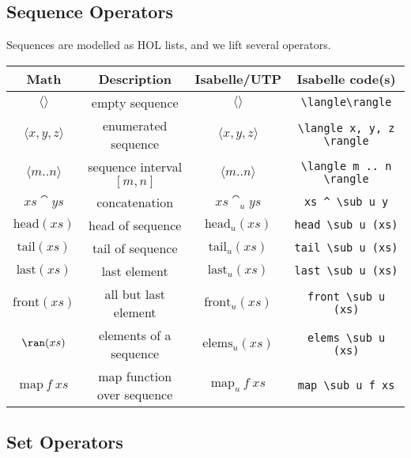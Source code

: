 \documentclass[11pt]{article}
\begin{document}
\subsection{Sequence Operators}

Sequences are modelled as HOL lists, and we lift several operators.

\vspace{2ex}

\begin{center}
\begin{tabular}{|c|c|c|c|} \hline
  \textbf{Math}                  & \textbf{Description}        & \textbf{Isabelle/UTP}          & \textbf{Isabelle code(s)} \\ \hline
  $\langle\rangle$               & empty sequence              & $\langle\rangle$               & \verb|\langle\rangle| \\
  $\langle x, y, z \rangle$      & enumerated sequence         & $\langle x, y, z \rangle$ & \verb|\langle x, y, z \rangle| \\
  $\langle m .. n \rangle$       & sequence interval $[m,n]$   & $\langle m .. n \rangle$       & \verb|\langle m .. n \rangle| \\
  $xs \cat ys$                   & concatenation               & $xs \cat_u ys$                 & \verb|xs ^ \sub u y| \\
  $\textrm{head}(xs)$            & head of sequence            & $\textrm{head}_u(xs)$          & \verb|head \sub u (xs)| \\
  $\textrm{tail}(xs)$            & tail of sequence            & $\textrm{tail}_u(xs)$          & \verb|tail \sub u (xs)| \\
  $\textrm{last}(xs)$            & last element                & $\textrm{last}_u(xs)$          & \verb|last \sub u (xs)| \\
  $\textrm{front}(xs)$           & all but last element        & $\textrm{front}_u(xs)$         & \verb|front \sub u (xs)| \\
  $\ran(xs)$                     & elements of a sequence      & $\textrm{elems}_u(xs)$         & \verb|elems \sub u (xs)| \\
  $\textrm{map}~f~xs$            & map function over sequence  & $\textrm{map}_u~f~xs$          & \verb|map \sub u f xs| \\
  \hline
\end{tabular}
\end{center}

\subsection{Set Operators}
\end{document}
